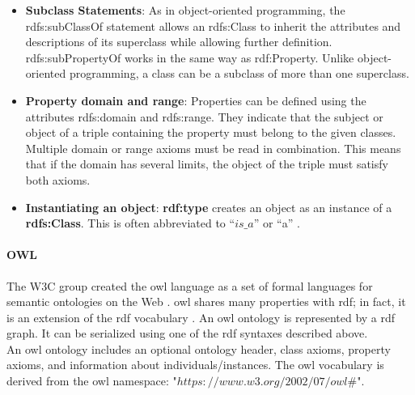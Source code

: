             \begin{itemize}
                \item \textbf{Subclass Statements}: As in object-oriented programming, the rdfs:subClassOf statement allows an rdfs:Class to inherit the attributes and descriptions of its superclass while allowing further definition. rdfs:subPropertyOf works in the same way as rdf:Property. Unlike object-oriented programming, a class can be a subclass of more than one superclass. 
                \item \textbf{Property domain and range}: Properties can be defined using the attributes rdfs:domain and rdfs:range. They indicate that the subject or object of a triple containing the property must belong to the given classes. Multiple domain or range axioms must be read in combination. This means that if the domain has several limits, the object of the triple must satisfy both axioms. 
                \item \textbf{Instantiating an object}: \textbf{rdf:type} creates an object as an instance of a \textbf{rdfs:Class}. This is often abbreviated to “$is\_a$” or “a” \cite{li2005ontology}.
            \end{itemize}
    
            \paragraph{OWL \label{para:owl}}
            The W3C group created the \acrshort{owl} language as a set of formal languages for semantic ontologies on the Web \cite{liu2010ontology}. \acrshort{owl} shares many properties with \acrshort{rdf}; in fact, it is an extension of the \acrshort{rdf} vocabulary \cite{mcguinness2004owl}. An \acrshort{owl} ontology is represented by a \acrshort{rdf} graph. It can be serialized using one of the \acrshort{rdf} syntaxes described above. \\
        
            An \acrshort{owl} ontology includes an optional ontology header, class axioms, property axioms, and information about individuals/instances. The \acrshort{owl} vocabulary is derived from the \acrshort{owl} namespace: "$https://www.w3.org/2002/07/owl\#$". 
        
